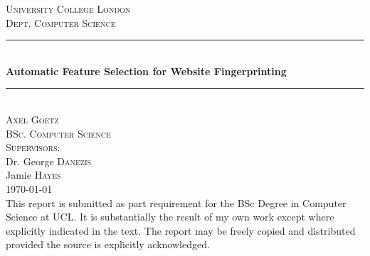 \newcommand{\HRule}{\rule{\linewidth}{0.5mm}}
\thispagestyle{empty}

\begin{center}
  \textsc{\LARGE University College London}\\[0.5cm]
  \textsc{\Large Dept. Computer Science}\\[0.5cm]

  \HRule \\ [0.4cm]
  { \Large \bfseries Automatic Feature Selection for Website Fingerprinting}\\[0.3cm]
  \HRule \\ [1cm]

  \textsc{\LARGE Axel Goetz}\\[0.3cm]

  \textsc{\Large BSc. Computer Science}\\[1cm]
  \textsc{\large Supervisors:}\\[0.1cm]
  \normalsize Dr. George \textsc{Danezis}\\
  \normalsize Jamie \textsc{Hayes}\\
  \vspace{0.2cm}
  \today\\[12cm]
  \small This report is submitted as part requirement for the BSc Degree in Computer Science at UCL.
      It is substantially the result of my own work except where explicitly indicated in the text.
      The report may be freely copied and distributed provided the source is explicitly acknowledged.

\end{center}

\newpage

